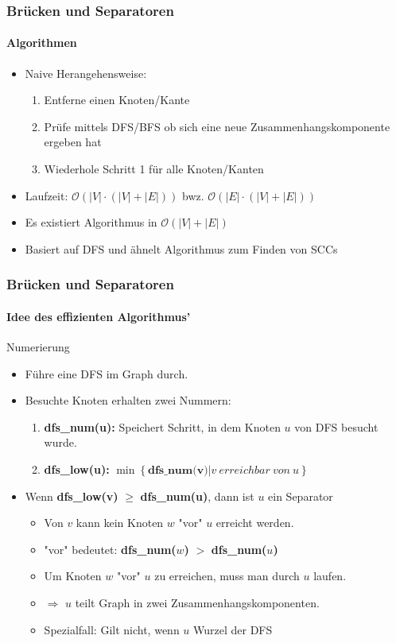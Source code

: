 \begin{frame}
	\frametitle{Brücken und Separatoren}
	\framesubtitle{Algorithmen}
	\begin{itemize}
		\item Naive Herangehensweise:
			\begin{enumerate}
				\item Entferne einen Knoten/Kante
				\item Prüfe mittels DFS/BFS ob sich eine neue Zusammenhangskomponente ergeben hat
				\item Wiederhole Schritt 1 für alle Knoten/Kanten
			\end{enumerate}
			\item Laufzeit: $\mathcal{O}(|V| \cdot (|V| + |E|))$ bwz. $\mathcal{O}(|E| \cdot (|V| + |E|))$
			\item Es existiert Algorithmus  in  $\mathcal{O}(|V| + |E|)$
			\item Basiert auf DFS und ähnelt Algorithmus zum Finden von SCCs
	\end{itemize}
\end{frame}
\begin{frame}
	\frametitle{Brücken und Separatoren}
	\framesubtitle{Idee des effizienten Algorithmus'}
	\begin{KITinfoblock}{Numerierung}
	\begin{itemize}
		\item Führe eine DFS im Graph durch.
		\item Besuchte Knoten erhalten zwei Nummern:
		
			\begin{enumerate}
				\item \textbf{dfs\_num(u):} Speichert Schritt, in dem Knoten $u$ von DFS besucht wurde.
				\item \textbf{dfs\_low(u):}  $\min \left \{\textbf{dfs\_num(v)} | v \ erreichbar \ von \ u \right \}$
			\end{enumerate}
\end{itemize}
\end{KITinfoblock}
	\begin{itemize}		
			\pause
			\item Wenn \textbf{dfs\_low(v)} $\geq$ \textbf{dfs\_num(u)}, dann ist $u$ ein Separator 
			\pause
			\begin{itemize}
				 \item Von $v$ kann kein Knoten $w$ "vor" $u$ erreicht werden.
				 \item "vor" bedeutet: \textbf{dfs\_num($w$)} $>$ \textbf{dfs\_num($u$)}
				 \item Um Knoten $w$ "vor" $u$ zu erreichen, muss man durch $u$ laufen.
				 \item $\Rightarrow$ $u$ teilt Graph in zwei Zusammenhangskomponenten.
				 \item Spezialfall: Gilt nicht, wenn $u$ Wurzel der DFS
			\end{itemize} 
	\end{itemize}
\end{frame}
